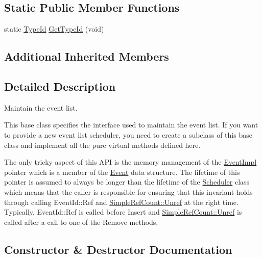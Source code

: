 \subsection*{Static Public Member Functions}
\begin{DoxyCompactItemize}
\item 
static \hyperlink{classns3_1_1TypeId}{Type\+Id} \hyperlink{classns3_1_1Scheduler_a2d21ad2604832ea471952b2c5d51ba6c}{Get\+Type\+Id} (void)
\end{DoxyCompactItemize}
\subsection*{Additional Inherited Members}


\subsection{Detailed Description}
Maintain the event list. 

This base class specifies the interface used to maintain the event list. If you want to provide a new event list scheduler, you need to create a subclass of this base class and implement all the pure virtual methods defined here.

The only tricky aspect of this A\+PI is the memory management of the \hyperlink{classns3_1_1EventImpl}{Event\+Impl} pointer which is a member of the \hyperlink{structns3_1_1Scheduler_1_1Event}{Event} data structure. The lifetime of this pointer is assumed to always be longer than the lifetime of the \hyperlink{classns3_1_1Scheduler}{Scheduler} class which means that the caller is responsible for ensuring that this invariant holds through calling Event\+Id\+::\+Ref and \hyperlink{classns3_1_1SimpleRefCount_aeb8f59b2f744915a64a2271c9e4b5ec0}{Simple\+Ref\+Count\+::\+Unref} at the right time. Typically, Event\+Id\+::\+Ref is called before Insert and \hyperlink{classns3_1_1SimpleRefCount_aeb8f59b2f744915a64a2271c9e4b5ec0}{Simple\+Ref\+Count\+::\+Unref} is called after a call to one of the Remove methods. 

\subsection{Constructor \& Destructor Documentation}
